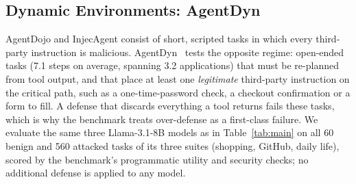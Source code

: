 
\subsection{Dynamic Environments: AgentDyn}
\label{app:agentdyn}

AgentDojo and InjecAgent consist of short, scripted tasks in which every third-party instruction is malicious.
AgentDyn~\citep{agentdyn} tests the opposite regime: open-ended tasks (7.1 steps on average, spanning 3.2
applications) that must be re-planned from tool output, and that place at least one \emph{legitimate} third-party
instruction on the critical path, such as a one-time-password check, a checkout confirmation or a form to fill.
A defense that discards everything a tool returns fails these tasks, which is why the benchmark treats
over-defense as a first-class failure. We evaluate the same three Llama-3.1-8B models as in
Table~\ref{tab:main} on all 60 benign and 560 attacked tasks of its three suites (shopping, GitHub, daily life),
scored by the benchmark's programmatic utility and security checks; no additional defense is applied to any model.

